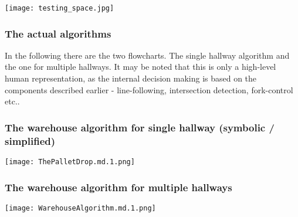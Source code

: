 \documentclass[../report.tex]{subfiles}
\begin{document}
\quad
\begin{center}
    \texttt{[image: testing\_space.jpg]}
\end{center}
\subsubsection{The actual algorithms}

In the following there are the two flowcharts. The single hallway algorithm
and the one for multiple hallways. It may be noted that this is only a 
high-level human representation, as the internal decision making is based
on the components described earlier - line-following, intersection detection, fork-control
etc..

\subsubsection{The warehouse algorithm for single hallway (symbolic / simplified)}
\texttt{[image: ThePalletDrop.md.1.png]}
\subsubsection{The warehouse algorithm for multiple hallways}
\texttt{[image: WarehouseAlgorithm.md.1.png]}
\end{document}
